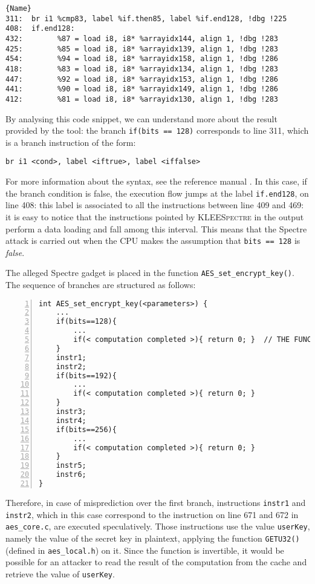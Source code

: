 \documentclass[12pt,a4paper]{book}
\theoremstyle{definition}
\begin{document}
	\lstset{numbers=none}
	\begin{lstlisting}[caption=\texttt{assembly.ll} (for AES-CBC), label=asm1]{Name}
311:  br i1 %cmp83, label %if.then85, label %if.end128, !dbg !225
408:  if.end128:                                        
432:  		%87 = load i8, i8* %arrayidx144, align 1, !dbg !283
425:  		%85 = load i8, i8* %arrayidx139, align 1, !dbg !283
454:  		%94 = load i8, i8* %arrayidx158, align 1, !dbg !286
418:  		%83 = load i8, i8* %arrayidx134, align 1, !dbg !283
447:  		%92 = load i8, i8* %arrayidx153, align 1, !dbg !286
441:  		%90 = load i8, i8* %arrayidx149, align 1, !dbg !286
412:  		%81 = load i8, i8* %arrayidx130, align 1, !dbg !283
	\end{lstlisting}
	\vspace{3mm}
	
	By analysing this code snippet, we can understand more about the result provided by the tool: the branch \texttt{if(bits == 128)} corresponds to line 311, which is a branch instruction of the form:
	
	\begin{lstlisting}[frame=none]
	br i1 <cond>, label <iftrue>, label <iffalse>
	\end{lstlisting}
	
	For more information about the syntax, see the reference manual \cite{LLVMasm}. In this case, if the branch condition is false, the execution flow jumps at the label \texttt{if.end128}, on line 408: this label is associated to all the instructions between line 409 and 469: it is easy to notice that the instructions pointed by \textsc{KLEESpectre} in the output perform a data loading and fall among this interval. This means that the Spectre attack is carried out when the CPU makes the assumption that \texttt{bits == 128} is \textit{false}. 
	
	The alleged Spectre gadget is placed in the function \texttt{AES\_set\_encrypt\_key()}. The sequence of branches are structured as follows:
	
	\begin{lstlisting}[numbers=left]
int AES_set_encrypt_key(<parameters>) {
	...
	if(bits==128){
		...
		if(< computation completed >){ return 0; }	// THE FUNCTION RETURNS
	}
	instr1;
	instr2;
	if(bits==192){
		...
		if(< computation completed >){ return 0; }
	}
	instr3;
	instr4;
	if(bits==256){
		...
		if(< computation completed >){ return 0; }
	}
	instr5;
	instr6;
}
	\end{lstlisting}
	
	Therefore, in case of misprediction over the first branch, instructions \texttt{instr1} and \texttt{instr2}, which in this case correspond to the instruction on line 671 and 672 in \texttt{aes\_core.c}, are executed speculatively. Those instructions use the value \texttt{userKey}, namely the value of the secret key in plaintext, applying the function \texttt{GETU32()} (defined in \texttt{aes\_local.h}) on it. Since the function is invertible, it would be possible for an attacker to read the result of the computation from the cache and retrieve the value of \texttt{userKey}.
\end{document}
